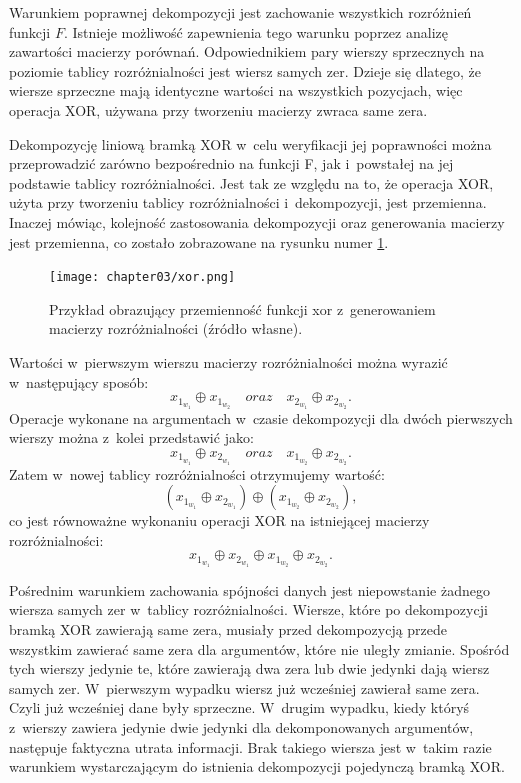 Warunkiem poprawnej dekompozycji jest zachowanie wszystkich rozróżnień funkcji $F$.
Istnieje możliwość zapewnienia tego warunku poprzez analizę zawartości macierzy porównań.
Odpowiednikiem pary wierszy sprzecznych na poziomie tablicy rozróżnialności jest wiersz samych zer.
Dzieje się dlatego,
że wiersze sprzeczne mają identyczne wartości na wszystkich pozycjach,
więc operacja XOR,
używana przy tworzeniu macierzy zwraca same zera.

Dekompozycję liniową bramką XOR w~celu weryfikacji jej poprawności można przeprowadzić zarówno bezpośrednio na funkcji F,
jak i~powstałej na jej podstawie tablicy rozróżnialności.
Jest tak ze względu na to,
że operacja XOR,
użyta przy tworzeniu tablicy rozróżnialności i~dekompozycji,
jest przemienna.
Inaczej mówiąc,
kolejność zastosowania dekompozycji oraz generowania macierzy jest przemienna,
co zostało zobrazowane na rysunku numer \ref{fig:xor}.

\begin{figure}[H]
\centering
\texttt{[image: chapter03/xor.png]}
\caption{Przykład obrazujący przemienność funkcji xor z~generowaniem macierzy rozróżnialności (źródło własne).}
\label{fig:xor}
\end{figure}

Wartości w~pierwszym wierszu macierzy rozróżnialności można wyrazić w~następujący sposób:
\begin{equation}
x_{1_{w_1}} \oplus x_{1_{w_2}} \quad oraz \quad x_{2_{w_1}} \oplus x_{2_{w_2}}.
\end{equation}
Operacje wykonane na argumentach w~czasie dekompozycji dla dwóch pierwszych wierszy można z~kolei przedstawić jako:
\begin{equation}
x_{1_{w_1}} \oplus x_{2_{w_1}} \quad oraz \quad x_{1_{w_2}} \oplus x_{2_{w_2}}.
\end{equation}
Zatem w~nowej tablicy rozróżnialności otrzymujemy wartość:
\begin{equation}
(x_{1_{w_1}} \oplus x_{2_{w_1}}) \oplus (x_{1_{w_2}} \oplus x_{2_{w_2}}),
\end{equation}
 co jest równoważne wykonaniu operacji XOR na istniejącej macierzy rozróżnialności:
\begin{equation}
x_{1_{w_1}} \oplus x_{2_{w_1}} \oplus x_{1_{w_2}} \oplus x_{2_{w_2}}.
\end{equation}

Pośrednim warunkiem zachowania spójności danych jest niepowstanie żadnego wiersza samych zer w~tablicy rozróżnialności.
Wiersze,
które po dekompozycji bramką XOR zawierają same zera,
musiały przed dekompozycją przede wszystkim zawierać same zera dla argumentów,
które nie uległy zmianie.
Spośród tych wierszy jedynie te,
które zawierają dwa zera lub dwie jedynki dają wiersz samych zer.
W~pierwszym wypadku wiersz już wcześniej zawierał same zera.
Czyli już wcześniej dane były sprzeczne.
W~drugim wypadku,
kiedy któryś z~wierszy zawiera jedynie dwie jedynki dla dekomponowanych argumentów,
następuje faktyczna utrata informacji.
Brak takiego wiersza jest w~takim razie warunkiem wystarczającym do istnienia dekompozycji pojedynczą bramką XOR.

